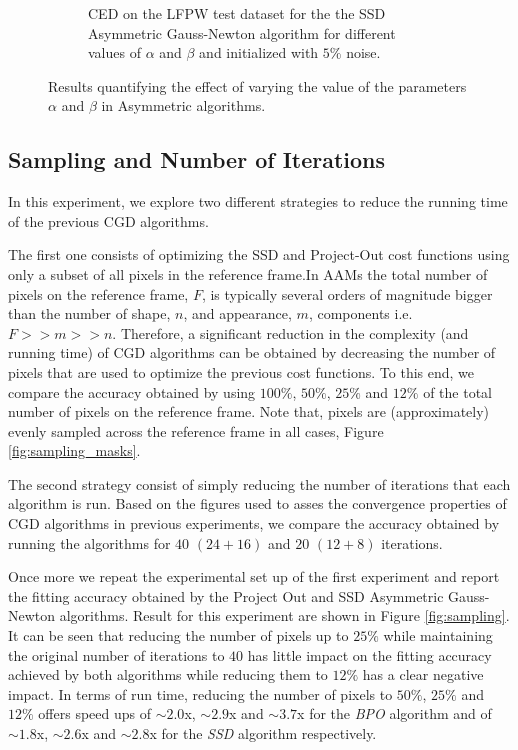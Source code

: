 \begin{figure}[h!]
\begin{subfigure}{0.48\textwidth}
	    \caption{CED on the LFPW test dataset for the the SSD Asymmetric Gauss-Newton algorithm for different values of $\alpha$ and $\beta$ and initialized with $5\%$ noise.}
	    \label{fig:ced_ssd_asy_gn_5}
	\end{subfigure}
	\caption{Results quantifying the effect of varying the value of the parameters $\alpha$ and $\beta$ in Asymmetric algorithms.}
	\label{fig:alpha}
\end{figure}



\subsection{Sampling and Number of Iterations}

In this experiment, we explore two different strategies to reduce the running time of the previous CGD algorithms. 

The first one consists of optimizing the SSD and Project-Out cost functions using only a subset of all pixels in the reference frame.In AAMs the total number of pixels on the reference frame, $F$, is typically several orders of magnitude bigger than the number of shape, $n$, and appearance, $m$, components i.e. $F>>m>>n$. Therefore, a significant reduction in the complexity (and running time) of CGD algorithms can be obtained by decreasing the number of pixels that are used to optimize the previous cost functions. To this end, we compare the accuracy obtained by using $100\%$, $50\%$, $25\%$ and $12\%$ of the total number of pixels on the reference frame. Note that, pixels are (approximately) evenly sampled across the reference frame in all cases, Figure \ref{fig:sampling_masks}.

The second strategy consist of simply reducing the number of iterations that each algorithm is run. Based on the figures used to asses the convergence properties of CGD algorithms in previous experiments, we compare the accuracy obtained by running the algorithms for $40$ $(24 + 16)$ and $20$ $(12 + 8)$ iterations.

Once more we repeat the experimental set up of the first experiment and report the fitting accuracy obtained by the Project Out and SSD Asymmetric Gauss-Newton algorithms. Result for this experiment are shown in Figure \ref{fig:sampling}. It can be seen that reducing the number of pixels up to $25\%$ while maintaining the original number of iterations to $40$ has little impact on the fitting accuracy achieved by both algorithms while reducing them to $12\%$ has a clear negative impact. In terms of run time, reducing the number of pixels to $50\%$, $25\%$ and $12\%$ offers speed ups of $\sim2.0$x, $\sim2.9$x and $\sim3.7$x for the \emph{BPO} algorithm and of $\sim1.8$x, $\sim2.6$x and $\sim2.8$x for the \emph{SSD} algorithm respectively. 

